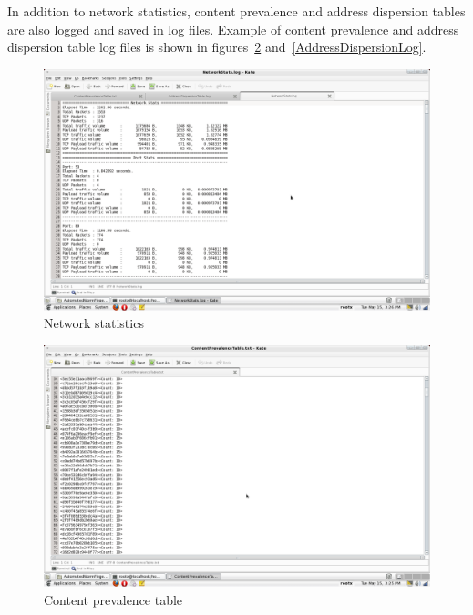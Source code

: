 \documentclass{report}
\begin{document}
In addition to network statistics, content prevalence and address dispersion tables are also logged and saved in log files. Example of content prevalence and address dispersion table log files is shown in figures~\ref{ContentPrevalenceLog} and~\ref{AddressDispersionLog}.

\begin{figure}[here]
\centering
\includegraphics[width=\textwidth]{NetworkStats.png}
\caption{Network statistics}
\label{NetworkStats}
\end{figure}

\begin{figure}[here]
\centering
\includegraphics[width=\textwidth]{ContentPrevalenceTable.png}
\caption{Content prevalence table}
\label{ContentPrevalenceLog}
\end{figure}
\end{document}
